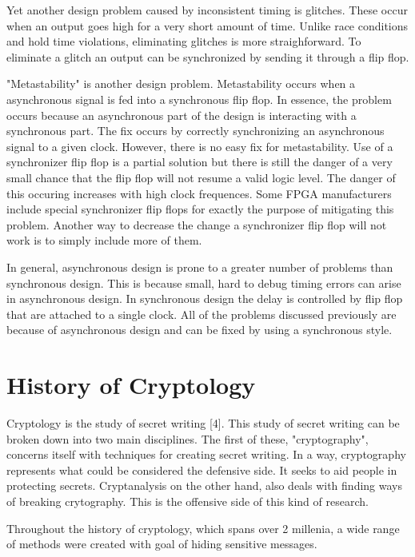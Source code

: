\documentclass{article}
\begin{document}
    Yet another design problem caused by inconsistent timing is glitches. These occur
    when an output goes high for a very short amount of time. Unlike race conditions
    and hold time violations, eliminating glitches is more straighforward.
    To eliminate a glitch an output can be synchronized by sending it through a flip flop.

    "Metastability" is another design problem. Metastability occurs when a asynchronous
    signal is fed into a synchronous flip flop. In essence, the problem occurs because
    an asynchronous part of the design is interacting with a synchronous part.
    The fix occurs by correctly synchronizing an asynchronous signal to a given clock.
    However, there is no easy fix for metastability. Use of a synchronizer flip flop
    is a partial solution but there is still the danger of a very small chance
    that the flip flop will not resume a valid logic level. The danger of this occuring
    increases with high clock frequences. Some FPGA manufacturers include special
    synchronizer flip flops for exactly the purpose of mitigating this problem.
    Another way to decrease the change a synchronizer flip flop will not work is
    to simply include more of them.

    In general, asynchronous design is prone to a greater number of problems
    than synchronous design. This is because small, hard to debug timing errors
    can arise in asynchronous design.
    In synchronous design the delay is controlled by flip flop that are attached
    to a single clock.
    All of the problems discussed previously are because of asynchronous design
    and can be fixed by using a synchronous style.

    \section{History of Cryptology}

    Cryptology is the study of secret writing [4]. This study of secret writing
    can be broken down into two main disciplines.
    The first of these, "cryptography", concerns itself with techniques
    for creating secret writing. In a way, cryptography represents what could
    be considered the defensive side. It seeks to aid people in
    protecting secrets.
    Cryptanalysis on the other hand, also deals with finding ways of breaking
    crytography. This is the offensive side of this kind of research.

    Throughout the history of cryptology, which spans over 2 millenia,
    a wide range of methods were created with goal of hiding sensitive
    messages.
\end{document}
